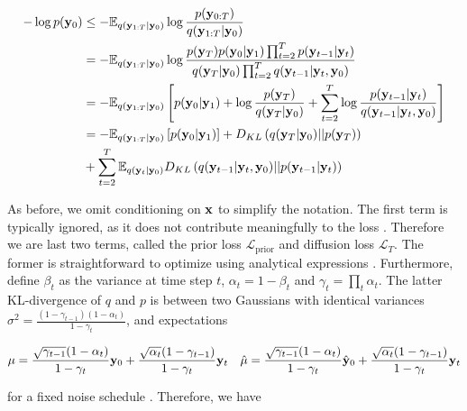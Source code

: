 \begin{align*}
-\log p(\bold{y}_{0}) &\leq - \mathbb{E}_{q(\bold{y}_{1:T}\lvert\bold{y}_{0})} \log \frac{p(\bold{y}_{0:T})}{q(\bold{y}_{1:T}\lvert\bold{y}_{0})}\\
&= -\mathbb{E}_{q(\bold{y}_{1:T}\lvert\bold{y}_{0})} \log \frac{p(\bold{y}_{T})p(\bold{y}_0\lvert\bold{y}_1) \prod_{t=2}^{T}p(\bold{y}_{t-1}\lvert\bold{y}_t)}{q(\bold{y}_T\lvert\bold{y}_0)\prod_{t=2}^{T}q(\bold{y}_{t-1}\lvert\bold{y}_t,\bold{y}_0)}\\
&= -\mathbb{E}_{q(\bold{y}_{1:T}\lvert\bold{y}_{0})} \left[ p(\bold{y}_0\lvert\bold{y}_1) + \log \frac{p(\bold{y}_{T})}{q(\bold{y}_T\lvert\bold{y}_0)} + \sum_{t=2}^{T} \log \frac{p(\bold{y}_{t-1}\lvert\bold{y}_t)}{q(\bold{y}_{t-1}\lvert\bold{y}_t,\bold{y}_0)}\right]\\
&= -\mathbb{E}_{q(\bold{y}_{1:T}\lvert\bold{y}_{0})} \left[ p(\bold{y}_0\lvert\bold{y}_1)\right] + D_{KL}\left(q(\bold{y}_T\lvert\bold{y}_0) \lvert\lvert p(\bold{y}_{T})\right) \\
&+ \sum_{t=2}^{T} \mathbb{E}_{q(\bold{y}_{t}\lvert\bold{y}_{0})} D_{KL}\left(q(\bold{y}_{t-1}\lvert\bold{y}_t,\bold{y}_0)\lvert\lvert p(\bold{y}_{t-1}\lvert\bold{y}_t) \right)
\end{align*}

As before, we omit conditioning on $\bold{x}$ to simplify the notation. The first term is typically ignored, as it does not contribute meaningfully to the loss \parencite{Ribeiro2024}. Therefore we are last two terms, called the prior loss $\mathcal{L}_{\mathrm{prior}}$ and diffusion loss $\mathcal{L}_{T}$. The former is straightforward to optimize using analytical expressions \parencite{Maggiora2023}. Furthermore, define $\beta_{t}$ as the variance at time step $t$, $\alpha_{t}=1-\beta_{t}$ and $\gamma_{t}=\prod_{t}\alpha_{t}$. The latter KL-divergence of $q$ and $p$ is between two Gaussians with identical variances $\sigma^{2} = \frac{(1-\gamma_{t-1})(1-\alpha_{t})}{1-\gamma_{t}}$, and expectations

\begin{align*}
\mu = \frac{\sqrt{\gamma_{t-1}}(1-\alpha_{t})}{1-\gamma_{t}}\bold{y}_{0}+ \frac{\sqrt{\alpha_{t}}(1-\gamma_{t-1})}{{1-\gamma_{t}}}\bold{y}_{t} \quad \hat{\mu} = \frac{\sqrt{\gamma_{t-1}}(1-\alpha_{t})}{1-\gamma_{t}}\hat{\bold{y}}_{0}+ \frac{\sqrt{\alpha_{t}}(1-\gamma_{t-1})}{{1-\gamma_{t}}}\bold{y}_{t}
\end{align*}

for a fixed noise schedule \parencite{Saharia2021}. Therefore, we have

